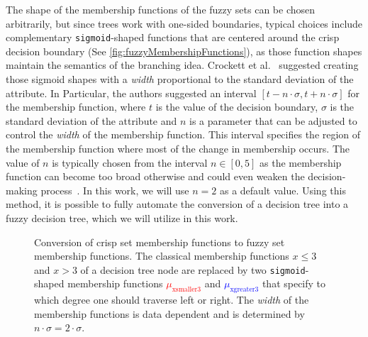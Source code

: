 The shape of the membership functions of the fuzzy sets can be chosen arbitrarily, but since trees work with one-sided boundaries, typical choices include complementary \texttt{sigmoid}-shaped functions that are centered around the crisp decision boundary (See \autoref{fig:fuzzyMembershipFunctions}), as those function shapes maintain the semantics of the branching idea. Crockett et al.~\cite{CROCKETT20062809} suggested creating those sigmoid shapes with a \emph{width} proportional to the standard deviation of the attribute. In Particular, the authors suggested an interval $[t-n\cdot \sigma, t+n\cdot \sigma]$ for the membership function, where  $t$ is the value of the decision boundary, $\sigma$ is the standard deviation of the attribute and $n$ is a parameter that can be adjusted to control the \emph{width} of the membership function. This interval specifies the region of the membership function where most of the change in membership occurs. The value of $n$ is typically chosen from the interval $n\in [0,5]$ as the membership function can become too broad otherwise and could even weaken the decision-making process~\cite{CROCKETT20062809}. In this work, we will use $n=2$ as a default value. Using this method, it is possible to fully automate the conversion of a decision tree into a fuzzy decision tree, which we will utilize in this work.


\begin{figure}[h]
    \centering
    \caption[Conversion of crisp tree node into fuzzy tree node]{Conversion of crisp set membership functions to fuzzy set membership functions. The classical membership functions $x \leq 3$ and $x>3$ of a decision tree node are replaced by two \texttt{sigmoid}-shaped membership functions \textcolor{red}{$\mu_{\text{xsmaller3}}$} and \textcolor{blue}{$\mu_{\text{xgreater3}}$} that specify to which degree one should traverse left or right. The \emph{width} of the membership functions is data dependent and is determined by $n\cdot \sigma = 2 \cdot \sigma$. }
    \label{fig:fuzzyMembershipFunctions}
\end{figure}

